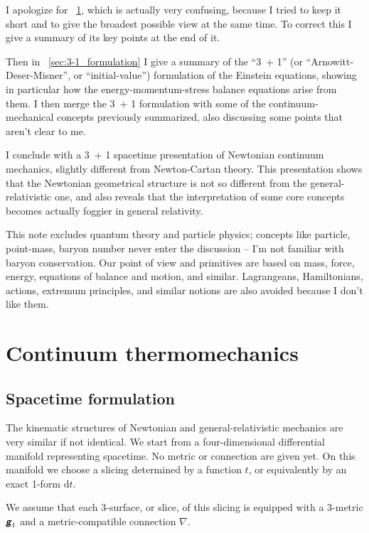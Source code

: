 \documentclass[\ifafour a4paper,12pt,\else a5paper,10pt,\fi%
onecolumn,oneside,article,%
british%
]{memoir}
\theoremstyle{remark}
\theoremstyle{innote}
\newcommand*{\mathte}[1]{\textbf{\textit{\textsf{#1}}}}
\newcommand*{\di}{\mathrm{d}}%
\renewcommand*{\|}[1][]{\nonscript\,#1\vert\nonscript\;\mathopen{}}
\newcommand*{\puzzle}{{\fontencoding{U}\fontfamily{fontawesometwo}\selectfont\symbol{225}}}
\newcommand*{\psect}{{\footnotesize\puzzle}}%
\newcommand*{\ygg}{g}
\newcommand*{\yg}{\mathte{\ygg}}
\newcommand*{\ynab}{\nabla}
\begin{document}
I apologize for \psect~\ref{sec:newtonian_continuum_thermomechanics}, which
is actually very confusing, because I tried to keep it short and to give
the broadest possible view at the same time. To correct this I give a
summary of its key points at the end of it.

Then in \psect~\ref{sec:3-1_formulation} I give a summary of the
\enquote{3~+ 1} (or \enquote{Arnowitt-Deser-Misner}, or
\enquote{initial-value}) formulation of the Einstein equations, showing in
particular how the energy-momentum-stress balance equations arise from
them. I then merge the 3~+ 1 formulation with some of the
continuum-mechanical concepts previously summarized, also discussing some
points that aren't clear to me.

I conclude with a 3~+ 1 spacetime presentation of Newtonian continuum
mechanics, slightly different from Newton-Cartan theory. This presentation
shows that the Newtonian geometrical structure is not so different from the
general-relativistic one, and also reveals that the interpretation of some
core concepts becomes actually foggier in general relativity.

This note excludes quantum theory and particle physics; concepts like
particle, point-mass, baryon number never enter the discussion -- I'm not
familiar with baryon conservation. Our point of view and primitives are
based on mass, force, energy, equations of balance and motion, and similar.
Lagrangeans, Hamiltonians, actions, extremum principles, and similar
notions are also avoided because I don't like them.


\section{Continuum thermomechanics}
\label{sec:newtonian_continuum_thermomechanics}


\subsection{Spacetime formulation}
\label{sec:newtonian_mechanics_spacetime}

The kinematic structures of Newtonian and general-relativistic mechanics
are very similar if not identical. We start from a four-dimensional
differential manifold representing spacetime. No metric or connection are
given yet. On this manifold we choose a slicing determined by a function
$t$, or equivalently by an exact 1-form $\di t$.


We assume that each 3-surface, or slice, of this slicing is equipped with
a 3-metric $\yg_t$ and a metric-compatible connection $\ynab$.
\end{document}

